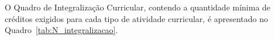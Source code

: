 
O Quadro de Integralização Curricular, contendo a quantidade mínima de créditos exigidos para cada tipo de atividade curricular, é apresentado no Quadro~\ref{tab:N_integralizacao}.

